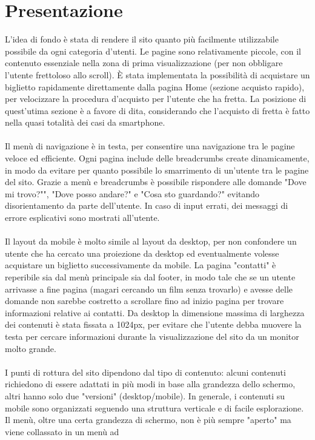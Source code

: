 \documentclass[a4paper, 12pt]{article}
\begin{document}
\section{Presentazione}
L'idea di fondo è stata di rendere il sito quanto più facilmente utilizzabile possibile da ogni categoria d'utenti.
Le pagine sono relativamente piccole, con il contenuto essenziale nella zona di prima visualizzazione (per non obbligare l'utente frettoloso allo scroll).
È stata implementata la possibilità di acquistare un biglietto rapidamente direttamente dalla pagina Home (sezione acquisto rapido), per velocizzare la procedura d'acquisto per l'utente che ha fretta.
La posizione di quest'utima sezione è a favore di dita, considerando che l'acquisto di fretta è fatto nella quasi totalità dei casi da smartphone.\\\\
Il menù di navigazione è in testa, per consentire una navigazione tra le pagine veloce ed efficiente.
Ogni pagina include delle breadcrumbs create dinamicamente, in modo da evitare per quanto possibile lo smarrimento di un'utente tra le pagine del sito.
Grazie a menù e breadcrumbs è possibile rispondere alle domande "Dove mi trovo?"", "Dove posso andare?" e "Cosa sto guardando?" evitando disorientamento da parte dell'utente.
In caso di input errati, dei messaggi di errore esplicativi sono mostrati all'utente.\\\\
Il layout da mobile è molto simile al layout da desktop, per non confondere un utente che ha cercato una proiezione da desktop ed eventualmente volesse acquistare un biglietto successivamente da mobile.
La pagina "contatti" è reperibile sia dal menù principale sia dal footer, in modo tale che se un utente arrivasse a fine pagina (magari cercando un film senza trovarlo) e avesse delle domande non sarebbe costretto a scrollare fino ad inizio pagina per trovare informazioni relative ai contatti.
Da desktop la dimensione massima di larghezza dei contenuti è stata fissata a 1024px, per evitare che l'utente debba muovere la testa per cercare informazioni durante la visualizzazione del sito da un monitor molto grande.\\\\
I punti di rottura del sito dipendono dal tipo di contenuto: alcuni contenuti richiedono di essere adattati in più modi in base alla grandezza dello schermo, altri hanno solo due "versioni" (desktop/mobile).
In generale, i contenuti su mobile sono organizzati seguendo una struttura verticale e di facile esplorazione. Il menù, oltre una certa grandezza di schermo, non è più sempre "aperto" ma viene collassato in un menù ad
\end{document}
